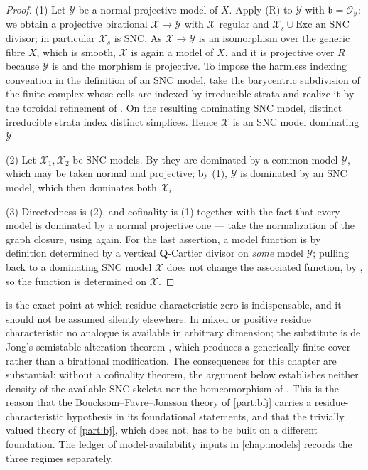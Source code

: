 \begin{proof}
(1) Let $\mathcal Y$ be a normal projective model of $X$. Apply
\textup{(R)} to $\mathcal Y$ with $\mathfrak b=\mathcal O_{\mathcal Y}$:
we obtain a projective birational $\mathcal X\to\mathcal Y$ with
$\mathcal X$ regular and $\mathcal X_s\cup\mathrm{Exc}$ an SNC divisor;
in particular $\mathcal X_s$ is SNC. As $\mathcal X\to\mathcal Y$ is an
isomorphism over the generic fibre $X$, which is smooth, $\mathcal X$ is
again a model of $X$, and it is projective over $R$ because
$\mathcal Y$ is and the morphism is projective.  To impose the harmless
indexing convention in the definition of an SNC model, take the barycentric
subdivision of the finite complex whose cells are indexed by irreducible
strata and realize it by the toroidal refinement of
\cite[Theorem~3.15]{BFJ16}.  On the resulting dominating SNC model, distinct
irreducible strata index distinct simplices. Hence $\mathcal X$ is an SNC model dominating
$\mathcal Y$.

(2) Let $\mathcal X_1,\mathcal X_2$ be SNC models. By
 they are dominated by a common model
$\mathcal Y$, which may be taken normal and projective; by (1),
$\mathcal Y$ is dominated by an SNC model, which then dominates both
$\mathcal X_i$.

(3) Directedness is (2), and cofinality is (1) together with the fact that
every model is dominated by a normal projective one --- take the
normalization of the graph closure, using
 again. For the last assertion, a model
function is by definition determined by a vertical
$\mathbf Q$-Cartier divisor on \emph{some} model $\mathcal Y$; pulling
back to a dominating SNC model $\mathcal X$ does not change the associated
function, by , so the function is
determined on $\mathcal X$.
\end{proof}

\begin{remark}
\label{rem:cofinality-scope}
 is the exact point at which residue characteristic
zero is indispensable, and it should not be assumed silently elsewhere. In
mixed or positive residue characteristic no analogue is available in
arbitrary dimension; the substitute is de Jong's semistable alteration
theorem , which produces a generically finite cover
rather than a birational modification. The consequences for this chapter are
substantial: without a cofinality theorem, the argument below establishes
neither density of the available SNC skeleta nor the homeomorphism of
. This is the reason that the
Boucksom--Favre--Jonsson theory of \cref{part:bfj} carries a
residue-characteristic hypothesis in its foundational statements, and that
the trivially valued theory of \cref{part:bj}, which does not, has to be
built on a different foundation. The ledger of model-availability inputs in
\cref{chap:models} records the three regimes separately.
\end{remark}

